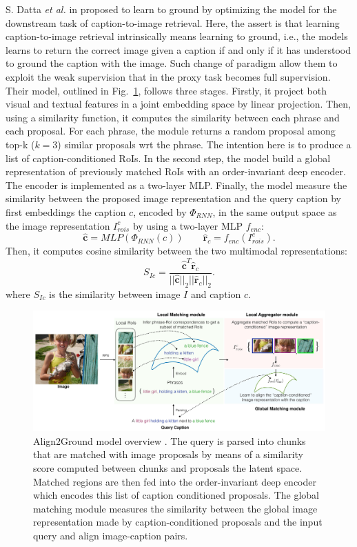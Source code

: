S. Datta \textit{et al.} in \cite{datta2019align2ground} proposed to
learn to ground by optimizing the model for the downstream task of
caption-to-image retrieval. Here, the assert is that learning
caption-to-image retrieval intrinsically means learning to ground,
i.e., the models learns to return the correct image given a caption if
and only if it has understood to ground the caption with the image.
Such change of paradigm allow them to exploit the weak supervision
that in the proxy task becomes full supervision. Their model, outlined
in Fig.~\ref{fig:align2ground-model}, follows three stages. Firstly,
it project both visual and textual features in a joint embedding space
by linear projection. Then, using a similarity function, it computes
the similarity between each phrase and each proposal. For each phrase,
the module returns a random proposal among top-k ($k = 3$) similar
proposals wrt the phrase. The intention here is to produce a list of
caption-conditioned RoIs. In the second step, the model build a global
representation of previously matched RoIs with an order-invariant deep
encoder. The encoder is implemented as a two-layer MLP. Finally, the
model measure the similarity between the proposed image representation
and the query caption by first embeddings the caption $c$, encoded by
$\Phi_{RNN}$, in the same output space as the image representation
$I^c_{rois}$ by using a two-layer MLP $f_{enc}$:
\begin{equation}
  \hat{\bm{c}} = MLP (\Phi_{RNN} (c)) \qquad \hat{\bm{r}}_c = f_{enc} (I^c_{rois}).
\end{equation}
Then, it computes cosine similarity between the two multimodal
representations:
\begin{equation}
  S_{Ic} = \frac{ \hat{\bm{c}}^T \hat{\bm{r}}_c }{ || \hat{\bm{c}} ||_2 || \hat{\bm{r}}_c ||_2 }.
\end{equation}
where $S_{Ic}$ is the similarity between image $I$ and caption $c$. 

\begin{figure}
  \centering
  \includegraphics[width=.8\textwidth]{figures/align2ground-model.png}
  \caption[Align2Ground model overview]{Align2Ground model overview
  \cite{datta2019align2ground}. The query is parsed into chunks that
  are matched with image proposals by means of a similarity score
  computed between chunks and proposals the latent space. Matched
  regions are then fed into the order-invariant deep encoder which
  encodes this list of caption conditioned proposals. The global
  matching module measures the similarity between the global image
  representation made by caption-conditioned proposals and the input
  query and align image-caption pairs.}
  \label{fig:align2ground-model}
\end{figure}

